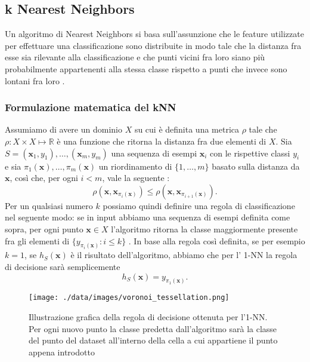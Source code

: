\subsection{k Nearest Neighbors}
Un algoritmo di Nearest Neighbors si basa sull'assunzione che le feature utilizzate per effettuare una classificazione sono distribuite in modo tale che la distanza fra esse sia rilevante alla classificazione e che punti vicini fra loro siano più probabilmente appartenenti alla stessa classe rispetto a punti che invece sono lontani fra loro \cite{shalev2014understanding}. 

\subsubsection{Formulazione matematica del kNN} 
Assumiamo di avere un dominio $X$ su cui è definita una metrica $\rho$ tale che $\rho:X\times X \mapsto \mathbb{R}$ è una funzione che ritorna la distanza fra due elementi di $X$. Sia $S=(\pmb{x}_{1},y_{1}),\dots,(\pmb{x}_{m},y_{m})$ una sequenza di esempi $\pmb{x}_{i}$ con le rispettive classi $y_{i}$ e sia $\pi_{1}(\pmb{x}),\dots,\pi_{m}(\pmb{x})$ un riordinamento di $\{1,\dots,m\}$ basato sulla distanza da $\pmb{x}$, così che, per ogni $i<m$, vale la seguente \cite{shalev2014understanding}:
\begin{equation}
	\rho(\pmb{x},\pmb{x}_{\pi_{i}(\pmb{x})}) \le \rho(\pmb{x},\pmb{x}_{\pi_{i+1}(\pmb{x})}).
\end{equation}
Per un qualsiasi numero $k$ possiamo quindi definire una regola di classificazione nel seguente modo: se in input abbiamo una sequenza di esempi definita come sopra, per ogni punto $\pmb{x}\in X$ l'algoritmo ritorna la classe maggiormente presente fra gli elementi di $\{y_{\pi_{i}(\pmb{x})} : i \le k\}$ \cite{shalev2014understanding}. In base alla regola così definita, se per esempio $k=1$, se $h_{S}(\pmb{x})$ è il risultato dell'algoritmo, abbiamo che per l' 1-NN la regola di decisione sarà semplicemente
\begin{equation}
	h_{S}(\pmb{x}) = y_{\pi_{1}(\pmb{x})}.
\end{equation} 
\begin{figure}
	\centering
	\texttt{[image: ./data/images/voronoi\_tessellation.png]}
	\caption{Illustrazione grafica della regola di decisione ottenuta per l'1-NN. Per ogni nuovo punto la classe predetta dall'algoritmo sarà la classe del punto del dataset all'interno della cella a cui appartiene il punto appena introdotto \cite{shalev2014understanding}}
	\label{voronoi}
\end{figure}

